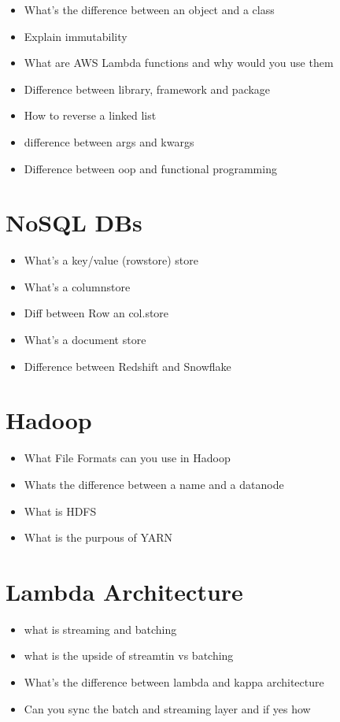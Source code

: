\documentclass[12pt, numbers=noenddot]{scrreprt} %
\begin{document}
\begin{itemize}
\item What's the difference between an object and a class
\item Explain immutability
\item What are AWS Lambda functions and why would you use them
\item Difference between library, framework and package
\item How to reverse a linked list
\item difference between args and kwargs
\item Difference between oop and functional programming
\end{itemize}

\section*{NoSQL DBs}

\begin{itemize}
\item What's a key/value (rowstore) store
\item What's a columnstore
\item Diff between Row an col.store
\item What's a document store
\item Difference between Redshift and Snowflake
\end{itemize}

\section*{Hadoop}

\begin{itemize}
\item What File Formats can you use in Hadoop
\item Whats the difference between a name and a datanode
\item What is HDFS
\item What is the purpous of YARN
\end{itemize}

\section*{Lambda Architecture}

\begin{itemize}
\item what is streaming and batching
\item what is the upside of streamtin vs batching
\item What's the difference between lambda and kappa architecture
\item Can you sync the batch and streaming layer and if yes how
\end{itemize}
\end{document}

